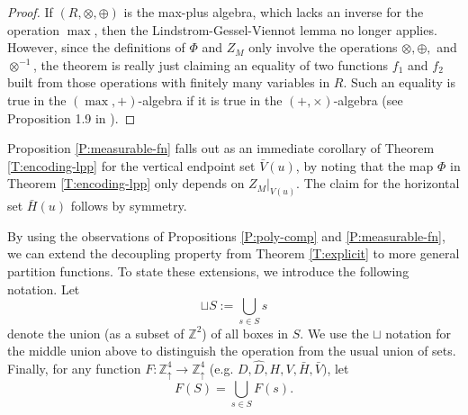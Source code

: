 \documentclass[aop, preprint]{imsart}
\theoremstyle{plain}
\theoremstyle{definition}
\theoremstyle{plain}
\newcommand{\Zd}{\mathds{Z}^4_\uparrow}
\newcommand{\Z}{\mathds{Z}}
\newcommand{\X}{\times}
\begin{document}
\begin{proof}
	
	If $(R, \otimes, \oplus)$ is the max-plus algebra, which lacks an inverse for the operation $\max$, then the Lindstrom-Gessel-Viennot lemma no longer applies. However, since the
	definitions of $\Phi$ and $Z_M$ only involve the operations $\otimes, \oplus,$ and $\otimes^{-1}$, the theorem is really just claiming an equality of two functions $f_1$ and $f_2$ built from those operations with finitely many variables in $R$. Such an equality is true in the $(\max, +)$-algebra if it is true in the $(+, \X)$-algebra (see Proposition 1.9 in \citep{noumi2002tropical}).
\end{proof}

Proposition \ref{P:measurable-fn} falls out as an immediate corollary of Theorem \ref{T:encoding-lpp} for the vertical endpoint set $\bar V(u)$, by noting that the map $\Phi$ in Theorem \ref{T:encoding-lpp} only depends on $Z_M|_{V(u)}$. The claim for the horizontal set $\bar H(u)$ follows by symmetry.

By using the observations of Propositions \ref{P:poly-comp} and \ref{P:measurable-fn}, we can extend the decoupling property from Theorem \ref{T:explicit} to more general partition functions. To state these extensions, we introduce the following notation. 
Let
$$
\sqcup S := \bigcup_{s \in S} s
$$ denote the union (as a subset of $\Z^2$) of all boxes in $S$. We use the $\sqcup$ notation for the middle union above to distinguish the operation from the usual union of sets. Finally, for any function $F:\Zd \to \Zd$ (e.g. $D, \hat D, H, V, \bar H, \bar V)$, let
$$
F(S) = \bigcup_{s \in S} F(s).
$$
\end{document}
